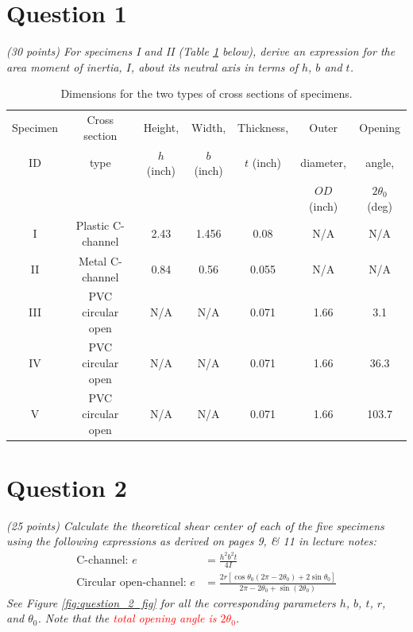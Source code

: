 \documentclass[12 pt]{article}
\begin{document}
\section*{Question 1}
\textit{(\num{30} points) For specimens I and II (Table \ref{tbl:question_1_table} below), derive an expression for the area moment of inertia, $I$, about its neutral axis in terms of $h$, $b$ and $t$.}

\begin{table}[!htbp]
\caption{Dimensions for the two types of cross sections of specimens.}
\begin{center}
	\begin{tabular}{|c|c|c|c|c|c|c|}
		\hline
		Specimen &Cross section &Height, &Width, &Thickness, &Outer &Opening \\
		ID&type&$h$ (\unit{inch})&$b$ (\unit{inch})&$t$ (\unit{inch})&diameter, &angle, \\
		&&&&&$OD$ (\unit{inch})&$2\theta_0$ (\unit{deg})\\
		\hline
		I&Plastic C-channel&2.43&1.456&0.08&N/A&N/A\\
		\hline
		II&Metal C-channel&0.84&0.56&0.055&N/A&N/A\\
		\hline
		III&PVC circular open&N/A&N/A&0.071&1.66&3.1\\
		\hline
		IV&PVC circular open&N/A&N/A&0.071&1.66&36.3\\
		\hline
		V&PVC circular open&N/A&N/A&0.071&1.66&103.7\\
		\hline
	\end{tabular}
\end{center}
\label{tbl:question_1_table}
\end{table}


\section*{Question 2}
\textit{(\num{25} points) Calculate the theoretical shear center of each of the five specimens using the following expressions as derived on pages \numlist{9;11} in lecture notes:}
\begin{align}
	\text{C-channel: }e&=\frac{h^2b^2t}{4I}\label{eqn:c_channel}\\
	\text{Circular open-channel: }e&=\frac{2r[\cos\theta_0(2\pi-2\theta_0)+2\sin\theta_0]}{2\pi-2\theta_0+\sin(2\theta_0)}
\end{align}
\textit{See Figure \ref{fig:question_2_fig} for all the corresponding parameters $h$, $b$, $t$, $r$, and $\theta_0$. Note that the \textcolor{red}{total opening angle is $2\theta_0$}.}
\end{document}
